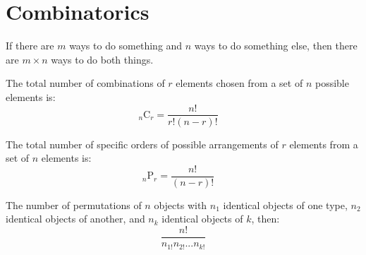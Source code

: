\documentclass[11pt]{article}
\newcommand{\comb}[2]{{}_{#1}\mathrm{C}_{#2}}
\newcommand{\perm}[2]{{}_{#1}\mathrm{P}_{#2}}
\begin{document}
\section{Combinatorics}

\begin{definition}\label{def:fund-count-principle}
    If there are $m$ ways to do something and $n$ ways to do something else, then there are
    $m \times n$ ways to do both things.
\end{definition}

\begin{definition}\label{def:combinations-formula}
    The total number of combinations of $r$ elements chosen from a set of $n$ possible elements is:
    \begin{equation*}
        \comb{n}{r} = \frac{n!}{r!(n-r)!}\quad
    \end{equation*}
\end{definition}

\begin{definition}\label{def:permutations-formula}
    The total number of specific orders of possible arrangements of $r$
    elements from a set of $n$ elements is:
    \begin{equation*}
        \perm{n}{r} = \frac{n!}{(n-r)!}\quad
    \end{equation*}

    The number of permutations of $n$ objects with $n_1$ identical objects
    of one type, $n_2$ identical objects of another, and $n_k$ identical objects
    of $k$, then:
    \begin{equation*}
        \frac{n!}{n_{1!}n_{2!} ... n_{k!}}
    \end{equation*}
\end{definition}
\end{document}
